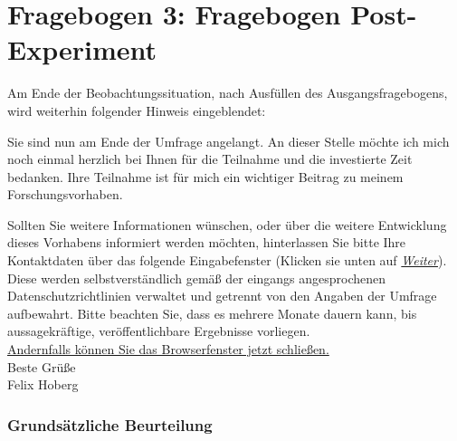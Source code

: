 

\chapter{Fragebogen 3: Fragebogen Post-Experiment} %




Am Ende der Beobachtungssituation, nach Ausfüllen des Ausgangsfragebogens, wird weiterhin folgender Hinweis eingeblendet:

\begin{framed}\label{App3:HinweisEnde}

\noindent Sie sind nun am Ende der Umfrage angelangt. An dieser Stelle möchte ich mich noch einmal herzlich bei Ihnen für die Teilnahme und die investierte Zeit bedanken. Ihre Teilnahme ist für mich ein wichtiger Beitrag zu meinem Forschungsvorhaben.

Sollten Sie weitere Informationen wünschen, oder über die weitere Entwicklung dieses Vorhabens informiert werden möchten, hinterlassen Sie bitte Ihre Kontaktdaten über das folgende Eingabefenster (Klicken sie unten auf \textit{\underline{Weiter}}). Diese werden selbstverständlich gemäß der eingangs angesprochenen Datenschutzrichtlinien verwaltet und getrennt von den Angaben der Umfrage aufbewahrt. Bitte beachten Sie, dass es mehrere Monate dauern kann, bis aussagekräftige, veröffentlichbare Ergebnisse vorliegen.\\

\underline{Andernfalls können Sie das Browserfenster jetzt schließen.}\\


\noindent Beste Grüße\\
\noindent Felix Hoberg
\end{framed}




\label{App3:F3} %



\subsection*{Grundsätzliche Beurteilung}
\label{App3:GB}



